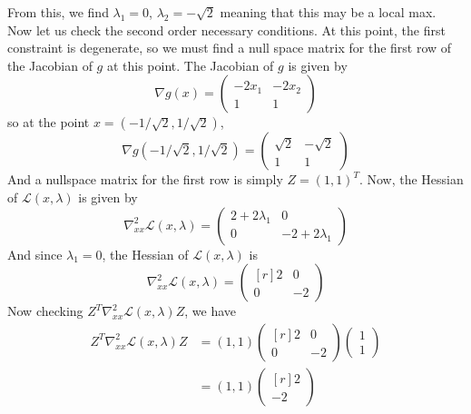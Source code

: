 \documentclass{article}
\begin{document}
\begin{itemize}
\begin{itemize}
\begin{itemize}
            From this, we find $\lambda_1 = 0$, $\lambda_2 = -\sqrt{2}$ meaning that this may be a local max. Now let us check the second order necessary conditions. At this point, the first constraint is degenerate, so we must find a null space matrix for the first row of the Jacobian of $g$ at this point. The Jacobian of $g$ is given by
            \[\nabla g(x) = \begin{pmatrix}
                -2x_1 & -2x_2\\
                1 & 1
            \end{pmatrix}\]
            so at the point $x = (-1/\sqrt{2}, 1/\sqrt{2})$, 
            \[\nabla g(-1/\sqrt{2}, 1/\sqrt{2}) = \begin{pmatrix}
                \sqrt{2} & -\sqrt{2}\\
                1 & 1
            \end{pmatrix}\]
            And a nullspace matrix for the first row is simply $Z = (1,1)^T$. Now, the Hessian of $\mathscr{L}(x,\lambda)$ is given by
            \[\nabla_{xx}^2\mathscr{L}(x,\lambda) = \begin{pmatrix}
                2 + 2\lambda_1 & 0\\
                0 & -2 + 2\lambda_1
            \end{pmatrix}\]
            And since $\lambda_1 = 0$, the Hessian of $\mathscr{L}(x,\lambda)$ is 
            \[\nabla_{xx}^2\mathscr{L}(x,\lambda) = \begin{pmatrix*}[r]
                2 & 0\\
                0 & -2
            \end{pmatrix*}\]
            Now checking $Z^T\nabla_{xx}^2\mathscr{L}(x,\lambda)Z$, we have
            \begin{align*}
                Z^T\nabla_{xx}^2\mathscr{L}(x,\lambda)Z &= (1,1)\begin{pmatrix*}[r]
                    2 & 0\\
                    0 & -2
                \end{pmatrix*}\begin{pmatrix}
                    1\\
                    1
                \end{pmatrix}\\
                &= (1,1)\begin{pmatrix*}[r]
                    2\\
                    -2
                \end{pmatrix*}\\

\end{align*}
\end{itemize}
\end{itemize}
\end{itemize}
\end{document}
